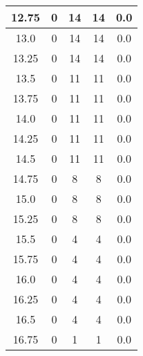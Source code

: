 \documentclass[letterpaper, 12pt]{article}
\begin{document}
\begin{longtable}{|c|c|c|c|c|}
\hline
12.75 & 0 & 14 & 14 & 0.0 \\
\hline
13.0 & 0 & 14 & 14 & 0.0 \\
\hline
13.25 & 0 & 14 & 14 & 0.0 \\
\hline
13.5 & 0 & 11 & 11 & 0.0 \\
\hline
13.75 & 0 & 11 & 11 & 0.0 \\
\hline
14.0 & 0 & 11 & 11 & 0.0 \\
\hline
14.25 & 0 & 11 & 11 & 0.0 \\
\hline
14.5 & 0 & 11 & 11 & 0.0 \\
\hline
14.75 & 0 & 8 & 8 & 0.0 \\
\hline
15.0 & 0 & 8 & 8 & 0.0 \\
\hline
15.25 & 0 & 8 & 8 & 0.0 \\
\hline
15.5 & 0 & 4 & 4 & 0.0 \\
\hline
15.75 & 0 & 4 & 4 & 0.0 \\
\hline
16.0 & 0 & 4 & 4 & 0.0 \\
\hline
16.25 & 0 & 4 & 4 & 0.0 \\
\hline
16.5 & 0 & 4 & 4 & 0.0 \\
\hline
16.75 & 0 & 1 & 1 & 0.0 \\
\hline
\end{longtable}
\end{document}

